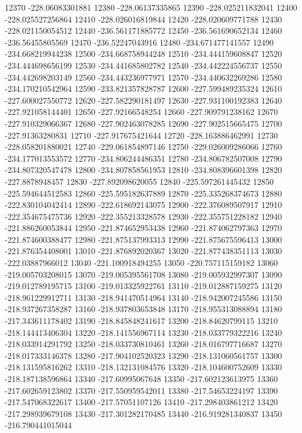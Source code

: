 {12370 -228.06083301881
12380 -228.06137335865
12390 -228.025211832041
12400 -228.025527256864
12410 -228.026016819844
12420 -228.020609771788
12430 -228.021150054512
12440 -236.561171885772
12450 -236.561690652134
12460 -236.56455805569
12470 -236.52247043916
12480 -234.671477141557
12490 -234.668219944238
12500 -234.668758944248
12510 -234.444159608847
12520 -234.444698656199
12530 -234.441685802782
12540 -234.442224556737
12550 -234.442698203149
12560 -234.443236977971
12570 -234.440632269286
12580 -234.170210542964
12590 -233.821357828787
12600 -227.599489235324
12610 -227.600027550772
12620 -227.582290181497
12630 -227.931100192383
12640 -227.921058144401
12650 -227.92166548254
12660 -227.909791238162
12670 -227.910329066367
12680 -227.902463078285
12690 -227.902515665475
12700 -227.91363280831
12710 -227.917675421644
12720 -228.163886462991
12730 -228.058201880021
12740 -229.061854897146
12750 -229.026009286066
12760 -234.177013553572
12770 -234.806244486351
12780 -234.806782507008
12790 -234.807320547478
12800 -234.807858561953
12810 -234.808396601398
12820 -227.8878948457
12830 -227.892098620055
12840 -225.597261445432
12850 -225.594644512583
12860 -225.595182637889
12870 -225.335268374673
12880 -222.830104042414
12890 -222.618692143075
12900 -222.376089507917
12910 -222.354675475736
12920 -222.355213328578
12930 -222.355751228182
12940 -221.886260053844
12950 -221.874652953438
12960 -221.874062797363
12970 -221.874600388477
12980 -221.875137993313
12990 -221.875675596413
13000 -221.876354408001
13010 -221.876892020367
13020 -221.877438351113
13030 -222.03887966012
13040 -221.100918494255
13050 -220.757115159182
13060 -219.005703208015
13070 -219.005395561708
13080 -219.005932997307
13090 -219.012789195715
13100 -219.013325922761
13110 -219.012887159275
13120 -218.961229912711
13130 -218.941470514964
13140 -218.942007245586
13150 -218.937267358287
13160 -218.937803653848
13170 -218.955313088894
13180 -217.343611178402
13190 -218.845848241617
13200 -218.84620799115
13210 -218.144413406304
13220 -218.141556967114
13230 -218.033779322216
13240 -218.033914291792
13250 -218.033730810461
13260 -218.016797716687
13270 -218.017333146378
13280 -217.904102520323
13290 -218.131060561757
13300 -218.131595816262
13310 -218.132131084576
13320 -218.104600752609
13330 -218.187138596864
13340 -217.60995067648
13350 -217.602123613975
13360 -217.602659123802
13370 -217.550959542011
13380 -217.54653224197
13390 -217.547068322617
13400 -217.57051107126
13410 -217.298403861212
13420 -217.298939679108
13430 -217.301282170485
13440 -216.919281340837
13450 -216.790441015044
}
